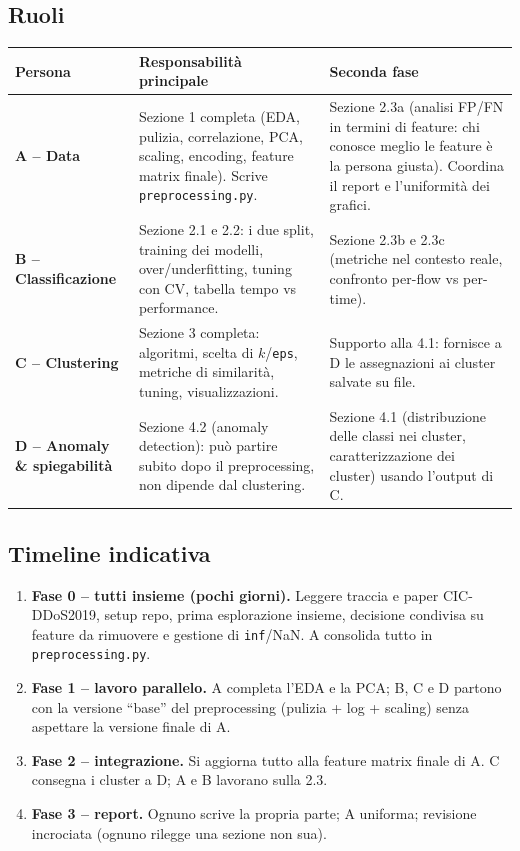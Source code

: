 \subsection{Ruoli}
\renewcommand{\arraystretch}{1.3}
\begin{tabularx}{\textwidth}{>{\bfseries}p{2.3cm} X X}
\toprule
Persona & Responsabilità principale & Seconda fase \\
\midrule
A -- Data & Sezione 1 completa (EDA, pulizia, correlazione, PCA, scaling,
encoding, feature matrix finale). Scrive \texttt{preprocessing.py}. &
Sezione 2.3a (analisi FP/FN in termini di feature: chi conosce meglio le feature
è la persona giusta). Coordina il report e l'uniformità dei grafici. \\
B -- Classificazione & Sezione 2.1 e 2.2: i due split, training dei modelli,
over/underfitting, tuning con CV, tabella tempo vs performance. &
Sezione 2.3b e 2.3c (metriche nel contesto reale, confronto per-flow vs
per-time). \\
C -- Clustering & Sezione 3 completa: algoritmi, scelta di $k$/\texttt{eps},
metriche di similarità, tuning, visualizzazioni. &
Supporto alla 4.1: fornisce a D le assegnazioni ai cluster salvate su file. \\
D -- Anomaly \& spiegabilità & Sezione 4.2 (anomaly detection): può partire
subito dopo il preprocessing, non dipende dal clustering. &
Sezione 4.1 (distribuzione delle classi nei cluster, caratterizzazione dei
cluster) usando l'output di C. \\
\bottomrule
\end{tabularx}

\subsection{Timeline indicativa}
\begin{enumerate}
  \item \textbf{Fase 0 -- tutti insieme (pochi giorni).} Leggere traccia e
        paper CIC-DDoS2019, setup repo, prima esplorazione insieme, decisione
        condivisa su feature da rimuovere e gestione di \texttt{inf}/NaN. A
        consolida tutto in \texttt{preprocessing.py}.
  \item \textbf{Fase 1 -- lavoro parallelo.} A completa l'EDA e la PCA; B, C e D
        partono con la versione ``base'' del preprocessing (pulizia + log +
        scaling) senza aspettare la versione finale di A.
  \item \textbf{Fase 2 -- integrazione.} Si aggiorna tutto alla feature matrix
        finale di A. C consegna i cluster a D; A e B lavorano sulla 2.3.
  \item \textbf{Fase 3 -- report.} Ognuno scrive la propria parte; A uniforma;
        revisione incrociata (ognuno rilegge una sezione non sua).
\end{enumerate}

